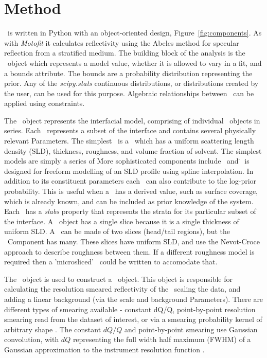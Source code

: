 \documentclass[12pt]{article}
\begin{document}
\section*{Method}
\ is written in Python with an object-oriented design, Figure~\ref{fig:components}. As with \emph{Motofit} \cite{Nelson2006} it calculates reflectivity using the Abeles method \cite{Heavens1955} for specular reflection from a stratified medium.
The building block of the analysis is the \Parameter\ object which represents a model value, whether it is allowed to vary in a fit, and a bounds attribute. The bounds are a probability distribution representing the prior. Any of the \emph{scipy.stats} \cite{Jones2001-2017} continuous distributions, or distributions created by the user, can be used for this purpose. Algebraic relationships between \Parameter\ can be applied using constraints.

The \Structure\ object represents the interfacial model, comprising of individual \Component\ objects in series. Each \Component\ represents a subset of the interface and contains several physically relevant Parameters. The simplest \Component\ is a \Slab\, which has a uniform scattering length density (SLD), thickness, roughness, and volume fraction of solvent. The simplest models are simply a series of \Slab\. More sophisticated components include \LipidLeaflet\ and \Spline\. \Spline\ is designed for freeform modelling of an SLD profile using spline interpolation. In addition to its constituent parameters each \Component\ can also contribute to the log-prior probability. This is useful when a \Component\ has a derived value, such as surface coverage, which is already known, and can be included as prior knowledge of the system. Each \Component\ has a \emph{slabs} property that represents the strata for its particular subset of the interface. A \Slab\ object has a single slice because it is a single thickness of uniform SLD. A \LipidLeaflet\ can be made of two slices (head/tail regions), but the \Spline\ Component has many. These slices have uniform SLD, and use the Nevot-Croce approach \cite{Nevot1980} to describe roughness between them. If a different roughness model is required then a 'microsliced' \Component\ could be written to accomodate that.

The \Structure\ object is used to construct a \ReflectModel\ object. This object is responsible for calculating the resolution smeared reflectivity of the \Structure\, scaling the data, and adding a linear background (via the scale and background Parameters). There are different types of smearing available - constant dQ/Q, point-by-point resolution smearing read from the dataset of interest, or via a smearing probability kernel of arbitrary shape \cite{Nelson2014}. The constant $dQ/Q$ and point-by-point smearing use Gaussian convolution, with $dQ$ representing the full width half maximum (FWHM) of a Gaussian approximation to the instrument resolution function \cite{Well2005}.
\end{document}
